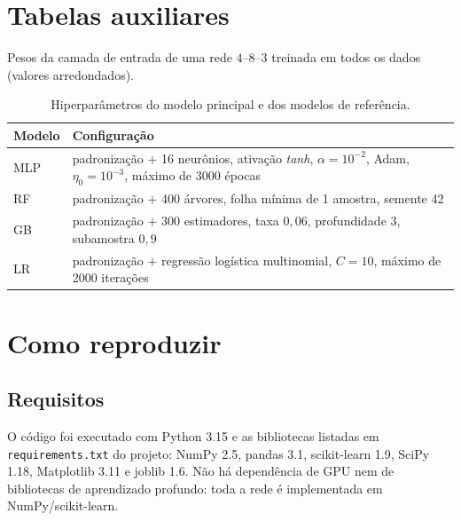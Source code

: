 \section{Tabelas auxiliares}
\label{ap:tabelas}

\begin{table}[htbp]
	\centering
	\caption{Pesos da camada de entrada de uma rede $4$--$8$--$3$ treinada em todos os dados
	(valores arredondados).}
	\label{tab:pesos}
	\small
	
\end{table}

\begin{table}[htbp]
	\centering
	\caption{Hiperparâmetros do modelo principal e dos modelos de referência.}
	\label{tab:hiper}
	\small
	\begin{tabular}{L{3.4cm} L{10.2cm}}
		\toprule
		\textbf{Modelo} & \textbf{Configuração} \\
		\midrule
		MLP &
		padronização $+$ 16 neurônios, ativação \emph{tanh}, $\alpha=10^{-2}$, Adam,
		$\eta_0=10^{-3}$, máximo de 3000 épocas \\
		RF &
		padronização $+$ 400 árvores, folha mínima de 1 amostra, semente 42 \\
		GB &
		padronização $+$ 300 estimadores, taxa $0{,}06$, profundidade 3, subamostra $0{,}9$ \\
		LR &
		padronização $+$ regressão logística multinomial, $C=10$, máximo de 2000 iterações \\
		\bottomrule
	\end{tabular}
\end{table}

\section{Como reproduzir}
\label{ap:repro}

\subsection{Requisitos}

O código foi executado com Python 3.15 e as bibliotecas listadas em \texttt{requirements.txt} do
projeto: NumPy 2.5, pandas 3.1, scikit-learn 1.9, SciPy 1.18, Matplotlib 3.11 e joblib 1.6. Não há
dependência de GPU nem de bibliotecas de aprendizado profundo: toda a rede é implementada em
NumPy/scikit-learn.

